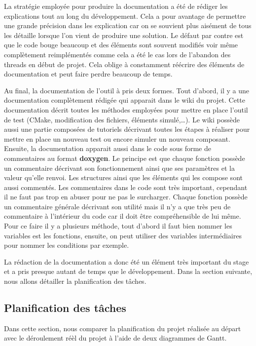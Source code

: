 \documentclass[a4paper]{article}
\begin{document}
La stratégie employée pour produire la documentation a été de rédiger les
explications tout au long du développement. Cela a pour avantage de permettre
une grande précision dans les explication car on se souvient plus aisément de
tous les détaille lorsque l'on vient de produire une solution. Le défaut par
contre est que le code bouge beaucoup et des éléments sont souvent modifiés voir
même complètement reimplémentés comme cela a été le cas lors de l'abandon des
threads en début de projet. Cela oblige à constamment réécrire des éléments de
documentation et peut faire perdre beaucoup de temps.

Au final, la documentation de l'outil à pris deux formes. Tout d'abord, il y a
une documentation complètement rédigée qui apparait dans le wiki du projet.
Cette documentation décrit toutes les méthodes employées pour mettre en place
l'outil de test (CMake, modification des fichiers, éléments simulé,\dots). Le
wiki possède aussi une partie composées de tutoriels décrivant toutes les étapes
à réaliser pour mettre en place un nouveau test ou encore simuler un nouveau
composant. Ensuite, la documentation apparait aussi dans le code sous forme de
commentaires au format \textbf{doxygen}. Le principe est que chaque fonction
possède un commentaire décrivant son fonctionnement ainsi que ses paramètres et
la valeur qu'elle renvoi. Les structures ainsi que les éléments qui les compose
sont aussi commentés. Les commentaires dans le code sont très important,
cependant il ne faut pas trop en abuser pour ne pas le surcharger. Chaque
fonction possède un commentaire générale décrivant son utilité mais il n'y a que
très peu de commentaire à l'intérieur du code car il doit être compréhensible de
lui même. Pour ce faire il y a plusieurs méthode, tout d'abord il faut bien
nommer les variables est les fonctions, ensuite, on peut utiliser des variables
intermédiaires pour nommer les conditions par exemple.

La rédaction de la documentation a donc été un élément très important du stage
et a pris presque autant de temps que le développement. Dans la section
suivante, nous allons détailler la planification des tâches.

\clearpage
\subsection{Planification des tâches}%

Dans cette section, nous comparer la planification du projet réalisée au départ
avec le déroulement réèl du projet à l'aide de deux diagrammes de Gantt.
\end{document}
